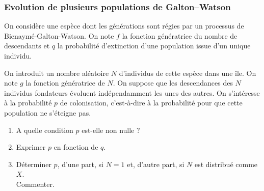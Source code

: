 \subsubsection{Evolution de plusieurs populations de Galton–Watson}

On considère une espèce dont les générations sont régies par un processus de Bienaymé-Galton-Watson. On note $f$ la fonction génératrice du nombre de descendants et $q$ la probabilité d'extinction d'une population issue d'un unique individu.

On introduit un nombre aléatoire $N$ d'individus de cette espèce dans une île. On note $g$ la fonction génératrice de $N$. On suppose que les descendances des $N$ individus fondateurs évoluent indépendamment les unes des autres. On s'intéresse à la probabilité $p$ de colonisation, c'est-à-dire à la probabilité pour que cette population ne s'éteigne pas.
\begin{enumerate}
  \item A quelle condition $p$ est-elle non nulle ?
  \item Exprimer $p$ en fonction de $q$. 
  \item Déterminer $p$, d'une part, si $N = 1$ et, d'autre part, si $N$ est distribué comme $X$. \\
  Commenter.
\end{enumerate}

